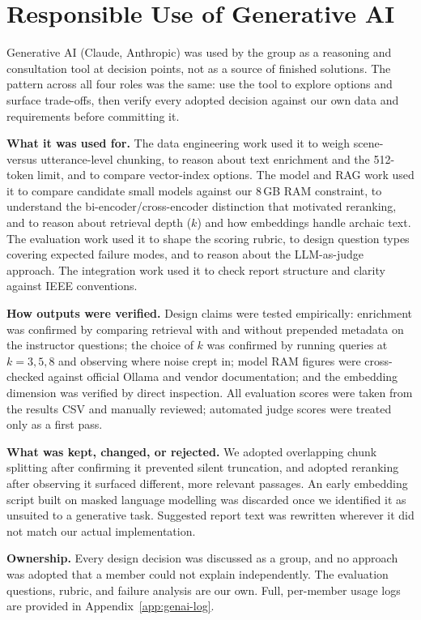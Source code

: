 \section{Responsible Use of Generative AI}
\label{sec:genai}

Generative AI (Claude, Anthropic) was used by the group as a reasoning
and consultation tool at decision points, not as a source of finished
solutions. The pattern across all four roles was the same: use the tool
to explore options and surface trade-offs, then verify every adopted
decision against our own data and requirements before committing it.

\textbf{What it was used for.} The data engineering work used it to
weigh scene- versus utterance-level chunking, to reason about text
enrichment and the 512-token limit, and to compare vector-index options.
The model and RAG work used it to compare candidate small models against
our 8\,GB RAM constraint, to understand the bi-encoder/cross-encoder
distinction that motivated reranking, and to reason about retrieval depth
($k$) and how embeddings handle archaic text. The evaluation work used it
to shape the scoring rubric, to design question types covering expected
failure modes, and to reason about the LLM-as-judge approach. The
integration work used it to check report structure and clarity against
IEEE conventions.

\textbf{How outputs were verified.} Design claims were tested
empirically: enrichment was confirmed by comparing retrieval with and
without prepended metadata on the instructor questions; the choice of $k$
was confirmed by running queries at $k=3,5,8$ and observing where noise
crept in; model RAM figures were cross-checked against official Ollama
and vendor documentation; and the embedding dimension was verified by
direct inspection. All evaluation scores were taken from the results CSV
and manually reviewed; automated judge scores were treated only as a
first pass.

\textbf{What was kept, changed, or rejected.} We adopted overlapping
chunk splitting after confirming it prevented silent truncation, and
adopted reranking after observing it surfaced different, more relevant
passages. An early embedding script built on masked language modelling
was discarded once we identified it as unsuited to a generative task.
Suggested report text was rewritten wherever it did not match our actual
implementation.

\textbf{Ownership.} Every design decision was discussed as a group, and
no approach was adopted that a member could not explain independently.
The evaluation questions, rubric, and failure analysis are our own. Full,
per-member usage logs are provided in Appendix~\ref{app:genai-log}.
